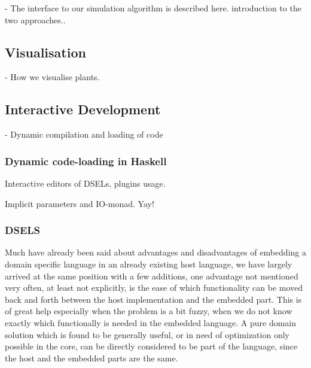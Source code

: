     - The interface to our simulation algorithm is described here.
      introduction to the two approaches..


\subsection{Visualisation}

    - How we visualise plants.


\subsection{Interactive Development}

    - Dynamic compilation and loading of code

\subsubsection{Dynamic code-loading in Haskell}


Interactive editors of DSELs, plugins usage. 

Implicit parameters and IO-monad. Yay!

\subsubsection{DSELS}

Much have already been said about advantages and disadvantages
of embedding a domain specific language in an already existing host
language\cite{dsels}, we have largely arrived at the same position
with a few additions, one advantage not mentioned very often, at least
not explicitly, is the ease of which functionality can be moved back
and forth between the host implementation and the embedded part.
This is of great help especially when the problem is a bit fuzzy, when
we do not know exactly which functionally is needed in the embedded
language. A pure domain solution which is found to be generally
useful, or in need of optimization only possible in the core, can be
directly considered to be part of the language, since the host and
the embedded parts are the same.




